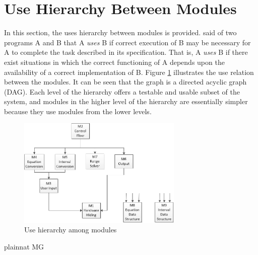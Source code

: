 \documentclass[12pt, titlepage]{article}
\begin{document}
\section{Use Hierarchy Between Modules} \label{SecUse}

In this section, the uses hierarchy between modules is
provided. \citet{Parnas1978} said of two programs A and B that A {\em uses} B if
correct execution of B may be necessary for A to complete the task described in
its specification. That is, A {\em uses} B if there exist situations in which
the correct functioning of A depends upon the availability of a correct
implementation of B.  Figure \ref{FigUH} illustrates the use relation between
the modules. It can be seen that the graph is a directed acyclic graph
(DAG). Each level of the hierarchy offers a testable and usable subset of the
system, and modules in the higher level of the hierarchy are essentially simpler
because they use modules from the lower levels.

\begin{figure}[H]
\centering
\includegraphics[width=0.7\textwidth]{figures/ModuleGraph.png}
\caption{Use hierarchy among modules}
\label{FigUH}
\end{figure}

\newpage

 {plainnat}
 {MG}
\end{document}
